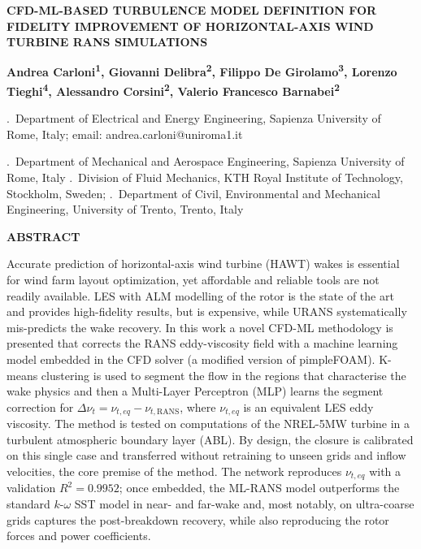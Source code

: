 \documentclass[12pt,a4paper]{article}
\renewenvironment{abstract}{%
  \begin{center}%
    {\arialfont\bfseries\fontsize{12}{14}\selectfont ABSTRACT}%
  \end{center}%
  \par\noindent\ignorespaces
}{\par\vspace{6pt}}
\begin{document}
\begin{center}
  {\arialnarrow\bfseries\fontsize{14}{17}\selectfont
   \MakeUppercase{CFD-ML-Based Turbulence Model Definition for Fidelity
   Improvement of Horizontal-Axis Wind Turbine RANS Simulations}\par}
  \vspace{6pt}
  {\arialfont\bfseries\fontsize{12}{14}\selectfont Andrea Carloni\textsuperscript{1},
  Giovanni Delibra\textsuperscript{2}, Filippo De Girolamo\textsuperscript{3}, Lorenzo
  Tieghi\textsuperscript{4}, Alessandro Corsini\textsuperscript{2}, Valerio Francesco
  Barnabei\textsuperscript{2}\par}
  \vspace{2pt}
  {\fontsize{12}{14}.\ Department of Electrical and Energy Engineering, Sapienza University
   of Rome, Italy; email: andrea.carloni@uniroma1.it\par}
  {\fontsize{12}{14}.\ Department of Mechanical and Aerospace Engineering, Sapienza University
   of Rome, Italy}
  {\fontsize{12}{14}.\ Division of Fluid Mechanics, KTH Royal Institute of Technology, Stockholm, Sweden;}
  {\fontsize{12}{14}.\ Department of Civil, Environmental and Mechanical Engineering, University of
   Trento, Trento, Italy}
\end{center}
\vspace{6pt}

\begin{abstract}
Accurate prediction of horizontal-axis wind turbine (HAWT) wakes is essential for wind
farm
layout optimization, yet affordable and reliable tools are not readily available.
LES with ALM modelling of the rotor is the state of the art and provides high-fidelity results,
but is expensive, while URANS systematically mis-predicts the wake recovery.
In this work a novel CFD-ML methodology is presented that corrects the RANS eddy-viscosity
field with a machine learning model embedded in the CFD solver (a modified version of pimpleFOAM).
K-means clustering is used to segment the flow in the regions that characterise the wake physics and then a 
Multi-Layer Perceptron 
(MLP) learns the segment correction for $\Delta\nu_t = \nu_{t,eq} - \nu_{t,\mathrm{RANS}}$, where
$\nu_{t,eq}$ is an equivalent LES eddy viscosity. The method is tested on computations of the
NREL-5MW turbine in a turbulent atmospheric boundary layer (ABL).
By design, the closure is calibrated on this single case and transferred without retraining
to unseen grids and inflow velocities, the core premise of the method. The network
reproduces
$\nu_{t,eq}$ with a validation $R^2 = 0.9952$; once embedded, the ML-RANS model
outperforms the
standard $k$-$\omega$ SST model in near- and far-wake and, most notably, on ultra-coarse
grids
captures the post-breakdown recovery, while also reproducing the rotor forces and power coefficients.
\end{abstract}
\end{document}
